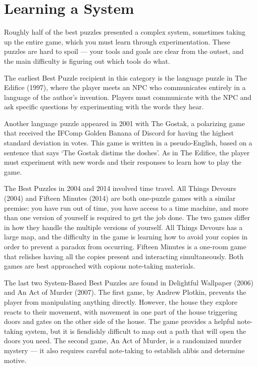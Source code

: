 \section{Learning a System}

Roughly half of the best puzzles presented a complex system, sometimes taking up the entire game, which you must learn through experimentation. These puzzles are hard to spoil — your tools and goals are clear from the outset, and the main difficulty is figuring out which tools do what.

The earliest Best Puzzle recipient in this category is the language puzzle in The Edifice (1997), where the player meets an NPC who communicates entirely in a language of the author’s invention. Players must communicate with the NPC and ask specific questions by experimenting with the words they hear.

Another language puzzle appeared in 2001 with The Gostak, a polarizing game that received the IFComp Golden Banana of Discord for having the highest standard deviation in votes. This game is written in a pseudo-English, based on a sentence that says ‘The Gostak distims the doshes’. As in The Edifice, the player must experiment with new words and their responses to learn how to play the game.

The Best Puzzles in 2004 and 2014 involved time travel. All Things Devours (2004) and Fifteen Minutes (2014) are both one-puzzle games with a similar premise: you have run out of time, you have access to a time machine, and more than one version of yourself is required to get the job done. The two games differ in how they handle the multiple versions of yourself. All Things Devours has a large map, and the difficulty in the game is learning how to avoid your copies in order to prevent a paradox from occurring. Fifteen Minutes is a one-room game that relishes having all the copies present and interacting simultaneously. Both games are best approached with copious note-taking materials.

The last two System-Based Best Puzzles are found in Delightful Wallpaper (2006) and An Act of Murder (2007). The first game, by Andrew Plotkin, prevents the player from manipulating anything directly. However, the house they explore reacts to their movement, with movement in one part of the house triggering doors and gates on the other side of the house. The game provides a helpful note-taking system, but it is fiendishly difficult to map out a path that will open the doors you need. The second game, An Act of Murder, is a randomized murder mystery — it also requires careful note-taking to establish alibis and determine motive.

